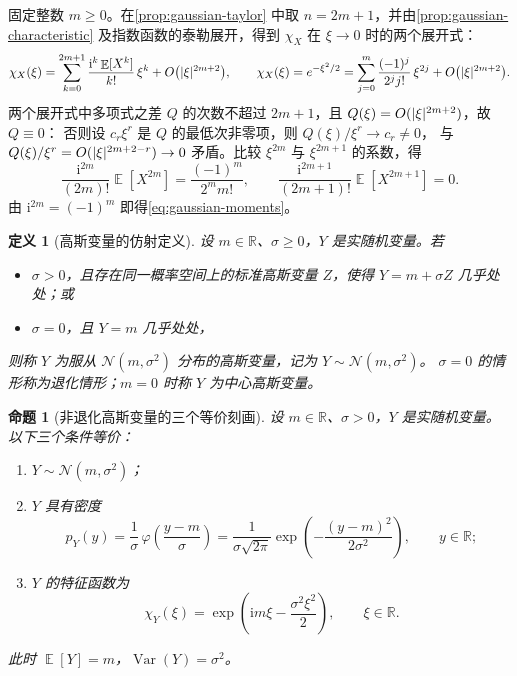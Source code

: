 \documentclass[UTF8,11pt,a4paper,oneside,fontset=fandol]{ctexrep}
\makeatletter
\numberwithin{equation}{section}
\theoremstyle{zhthm}
\newtheorem{proposition}[theorem]{命题}
\newtheorem{definition}[theorem]{定义}
\renewenvironment{proof}[1][\proofname]{\par
  \pushQED{\qed}%
  \normalfont\topsep6\p@\@plus6\p@\relax
  \trivlist
  \item[\hskip\labelsep\bfseries#1\hspace{0.5em}]\ignorespaces
}{%
  \popQED\endtrivlist\@endpefalse
}
\renewcommand{\proofname}{证明}
\newcommand{\R}{\mathbb{R}}
\DeclareMathOperator{\E}{\mathbb{E}}
\DeclareMathOperator{\Var}{Var}
\newcommand{\Normal}{\mathcal{N}}
\newcommand{\iu}{\mathrm{i}}
\DeclarePairedDelimiter{\abs}{\lvert}{\rvert}
\makeatother
\begin{document}
\begin{proof}
固定整数 $m\ge0$。在\cref{prop:gaussian-taylor} 中取 $n=2m+1$，并由\cref{prop:gaussian-characteristic}
及指数函数的泰勒展开，得到 $\chi_X$ 在 $\xi\to0$ 时的两个展开式：
\[
  \chi_X(\xi)=\sum_{k=0}^{2m+1}\frac{\iu^k\E[X^k]}{k!}\,\xi^k+O\bigl(\abs{\xi}^{2m+2}\bigr),
  \qquad
  \chi_X(\xi)=e^{-\xi^2/2}=\sum_{j=0}^{m}\frac{(-1)^j}{2^jj!}\,\xi^{2j}+O\bigl(\abs{\xi}^{2m+2}\bigr).
\]
两个展开式中多项式之差 $Q$ 的次数不超过 $2m+1$，且 $Q(\xi)=O(\abs{\xi}^{2m+2})$，故 $Q\equiv0$：
否则设 $c_r\xi^r$ 是 $Q$ 的最低次非零项，则 $Q(\xi)/\xi^r\to c_r\ne0$，
与 $Q(\xi)/\xi^r=O(\abs{\xi}^{2m+2-r})\to0$ 矛盾。比较 $\xi^{2m}$ 与 $\xi^{2m+1}$ 的系数，得
\[
  \frac{\iu^{2m}}{(2m)!}\E[X^{2m}]=\frac{(-1)^m}{2^mm!},\qquad
  \frac{\iu^{2m+1}}{(2m+1)!}\E[X^{2m+1}]=0.
\]
由 $\iu^{2m}=(-1)^m$ 即得\cref{eq:gaussian-moments}。
\end{proof}

\begin{definition}[高斯变量的仿射定义]
\label{def:gaussian-affine}
设 $m\in\R$、$\sigma\ge0$，$Y$ 是实随机变量。若
\begin{itemize}
  \item $\sigma>0$，且存在同一概率空间上的标准高斯变量 $Z$，使得 $Y=m+\sigma Z$ 几乎处处；或
  \item $\sigma=0$，且 $Y=m$ 几乎处处，
\end{itemize}
则称 $Y$ 为服从 $\Normal(m,\sigma^2)$ 分布的高斯变量，记为 $Y\sim\Normal(m,\sigma^2)$。
$\sigma=0$ 的情形称为退化情形；$m=0$ 时称 $Y$ 为中心高斯变量。
\end{definition}

\begin{proposition}[非退化高斯变量的三个等价刻画]
\label{prop:gaussian-equivalent}
设 $m\in\R$、$\sigma>0$，$Y$ 是实随机变量。以下三个条件等价：
\begin{enumerate}
  \item $Y\sim\Normal(m,\sigma^2)$；
  \item $Y$ 具有密度
    \begin{equation}
      \label{eq:gaussian-density-general}
      p_Y(y)=\frac1\sigma\,\varphi\!\left(\frac{y-m}{\sigma}\right)
      =\frac{1}{\sigma\sqrt{2\pi}}\exp\!\left(-\frac{(y-m)^2}{2\sigma^2}\right),
      \qquad y\in\R;
    \end{equation}
  \item $Y$ 的特征函数为
    \begin{equation}
      \label{eq:gaussian-characteristic-general}
      \chi_Y(\xi)=\exp\!\left(\iu m\xi-\frac{\sigma^2\xi^2}{2}\right),
      \qquad \xi\in\R.
    \end{equation}
\end{enumerate}
此时 $\E[Y]=m$，$\Var(Y)=\sigma^2$。
\end{proposition}
\end{document}
